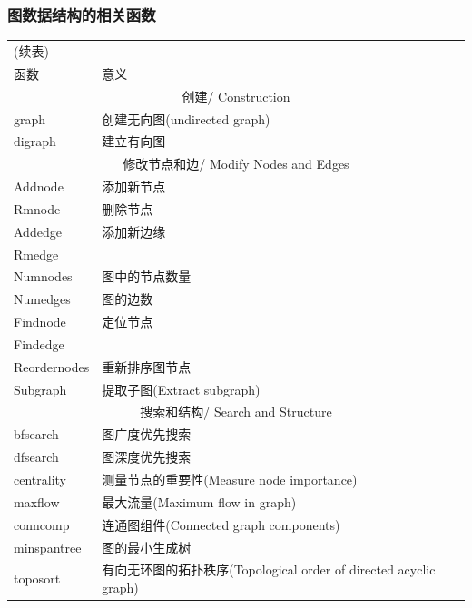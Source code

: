         \subsubsection{图数据结构的相关函数}
            \begin{longtable}{|l|l|}
            \hline
            \endfirsthead
            \multicolumn{2}{l}{(续表)}
            \endhead
            \hline
            \multicolumn{2}{c}{\itshape 接下页表格……}\\
            \endfoot
            \hline
            \endlastfoot
            函数 & 意义 \\
            \hline
            \multicolumn{2}{|c|}{创建/ Construction}\\
            \hline
            graph & 创建无向图(undirected graph)\\
            digraph &建立有向图\\
            \hline
            \multicolumn{2}{|c|}{修改节点和边/ Modify Nodes and Edges}\\
            \hline
            Addnode & 添加新节点\\
            Rmnode & 删除节点\\
            Addedge & 添加新边缘 \\
            Rmedge & {}\\
            Numnodes & 图中的节点数量\\
            Numedges & 图的边数\\
            Findnode & 定位节点\\
            Findedge & {}\\
            Reordernodes & 重新排序图节点\\
            Subgraph & 提取子图(Extract subgraph)\\
            \hline
            \multicolumn{2}{|c|}{搜索和结构/ Search and Structure}\\
            \hline
            bfsearch & 图广度优先搜索\\
            dfsearch & 图深度优先搜索\\
            centrality & 测量节点的重要性(Measure node importance)\\
            maxflow & 最大流量(Maximum flow in graph)\\
            conncomp & 连通图组件(Connected graph components)\\
            minspantree & 图的最小生成树\\
            toposort & 有向无环图的拓扑秩序(Topological order of directed acyclic graph)\\

\end{longtable}
